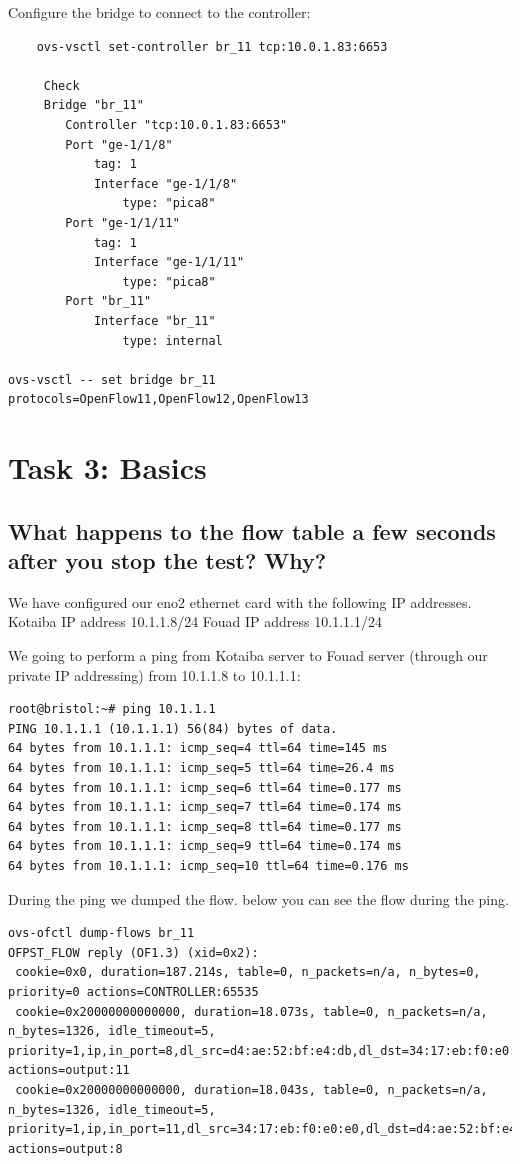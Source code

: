 \documentclass[a4paper]{article}
\begin{document}
Configure the bridge to connect to the controller:

\begin{verbatim}
    ovs-vsctl set-controller br_11 tcp:10.0.1.83:6653
     
     Check
     Bridge "br_11"
        Controller "tcp:10.0.1.83:6653"
        Port "ge-1/1/8"
            tag: 1
            Interface "ge-1/1/8"
                type: "pica8"
        Port "ge-1/1/11"
            tag: 1
            Interface "ge-1/1/11"
                type: "pica8"
        Port "br_11"
            Interface "br_11"
                type: internal

ovs-vsctl -- set bridge br_11 protocols=OpenFlow11,OpenFlow12,OpenFlow13
\end{verbatim}



\section{Task 3: Basics}
\label{sec:task3}

\subsection{What happens to the flow table a few seconds after you stop the test? Why?}
We have configured our eno2 ethernet card with the following IP addresses.
Kotaiba IP address 10.1.1.8/24
Fouad IP address 10.1.1.1/24

We going to perform a ping from Kotaiba server to Fouad server 
(through our private IP addressing) from 10.1.1.8 to 10.1.1.1:


\begin{verbatim}
root@bristol:~# ping 10.1.1.1
PING 10.1.1.1 (10.1.1.1) 56(84) bytes of data.
64 bytes from 10.1.1.1: icmp_seq=4 ttl=64 time=145 ms
64 bytes from 10.1.1.1: icmp_seq=5 ttl=64 time=26.4 ms
64 bytes from 10.1.1.1: icmp_seq=6 ttl=64 time=0.177 ms
64 bytes from 10.1.1.1: icmp_seq=7 ttl=64 time=0.174 ms
64 bytes from 10.1.1.1: icmp_seq=8 ttl=64 time=0.177 ms
64 bytes from 10.1.1.1: icmp_seq=9 ttl=64 time=0.174 ms
64 bytes from 10.1.1.1: icmp_seq=10 ttl=64 time=0.176 ms
\end{verbatim}

During the ping we dumped the flow. below you can see the flow during the ping.

\begin{verbatim}
ovs-ofctl dump-flows br_11 
OFPST_FLOW reply (OF1.3) (xid=0x2):
 cookie=0x0, duration=187.214s, table=0, n_packets=n/a, n_bytes=0, priority=0 actions=CONTROLLER:65535
 cookie=0x20000000000000, duration=18.073s, table=0, n_packets=n/a, n_bytes=1326, idle_timeout=5, priority=1,ip,in_port=8,dl_src=d4:ae:52:bf:e4:db,dl_dst=34:17:eb:f0:e0:e0,nw_src=10.1.1.8,nw_dst=10.1.1.1 actions=output:11
 cookie=0x20000000000000, duration=18.043s, table=0, n_packets=n/a, n_bytes=1326, idle_timeout=5, priority=1,ip,in_port=11,dl_src=34:17:eb:f0:e0:e0,dl_dst=d4:ae:52:bf:e4:db,nw_src=10.1.1.1,nw_dst=10.1.1.8 actions=output:8
\end{verbatim}
\end{document}

